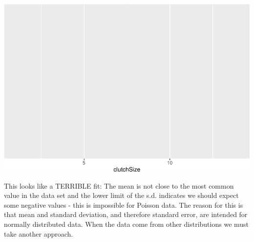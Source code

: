 \documentclass[
  a4paperpaper,
]{book}
\newenvironment{Shaded}{\begin{snugshade}}{\end{snugshade}}
\newcommand{\CommentTok}[1]{\textcolor[rgb]{0.56,0.35,0.01}{\textit{#1}}}
\newcommand{\DataTypeTok}[1]{\textcolor[rgb]{0.13,0.29,0.53}{#1}}
\newcommand{\DecValTok}[1]{\textcolor[rgb]{0.00,0.00,0.81}{#1}}
\newcommand{\KeywordTok}[1]{\textcolor[rgb]{0.13,0.29,0.53}{\textbf{#1}}}
\newcommand{\NormalTok}[1]{#1}
\newcommand{\OperatorTok}[1]{\textcolor[rgb]{0.81,0.36,0.00}{\textbf{#1}}}
\newcommand{\StringTok}[1]{\textcolor[rgb]{0.31,0.60,0.02}{#1}}
\begin{document}
\begin{Shaded}
\end{Shaded}

\begin{center}\includegraphics{BB852_files/figure-latex/unnamed-chunk-103-1} \end{center}

This looks like a TERRIBLE fit: The mean is not close to the most common value in the data set and the lower limit of the s.d. indicates we should expect some negative values - this is impossible for Poisson data. The reason for this is that mean and standard deviation, and therefore standard error, are intended for normally distributed data. When the data come from other distributions we must take another approach.
\end{document}
